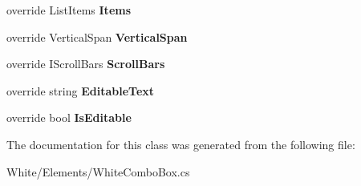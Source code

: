 \begin{DoxyCompactItemize}
\item 
\hypertarget{class_proto_test_1_1_golem_1_1_white_1_1_elements_1_1_white_combo_box_a7a3265b303487096fac59a3a7e879bdf}{override List\-Items {\bfseries Items}}\label{class_proto_test_1_1_golem_1_1_white_1_1_elements_1_1_white_combo_box_a7a3265b303487096fac59a3a7e879bdf}

\item 
\hypertarget{class_proto_test_1_1_golem_1_1_white_1_1_elements_1_1_white_combo_box_afaad1f05a0def53c65d64af6f157cb3c}{override Vertical\-Span {\bfseries Vertical\-Span}}\label{class_proto_test_1_1_golem_1_1_white_1_1_elements_1_1_white_combo_box_afaad1f05a0def53c65d64af6f157cb3c}

\item 
\hypertarget{class_proto_test_1_1_golem_1_1_white_1_1_elements_1_1_white_combo_box_a7977cdb0d09c5c890dbaaefbf64af5c7}{override I\-Scroll\-Bars {\bfseries Scroll\-Bars}}\label{class_proto_test_1_1_golem_1_1_white_1_1_elements_1_1_white_combo_box_a7977cdb0d09c5c890dbaaefbf64af5c7}

\item 
\hypertarget{class_proto_test_1_1_golem_1_1_white_1_1_elements_1_1_white_combo_box_abecf02ed8afbeb2827a077c1a5c3d3f8}{override string {\bfseries Editable\-Text}}\label{class_proto_test_1_1_golem_1_1_white_1_1_elements_1_1_white_combo_box_abecf02ed8afbeb2827a077c1a5c3d3f8}

\item 
\hypertarget{class_proto_test_1_1_golem_1_1_white_1_1_elements_1_1_white_combo_box_a39aa6ee0518c4e44d7a024502149bf58}{override bool {\bfseries Is\-Editable}}\label{class_proto_test_1_1_golem_1_1_white_1_1_elements_1_1_white_combo_box_a39aa6ee0518c4e44d7a024502149bf58}

\end{DoxyCompactItemize}


The documentation for this class was generated from the following file\-:\begin{DoxyCompactItemize}
\item 
White/\-Elements/White\-Combo\-Box.\-cs\end{DoxyCompactItemize}
